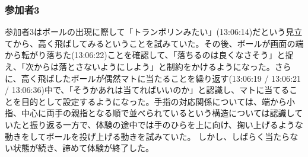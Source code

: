 \subsubsection*{参加者3}
参加者3はボールの出現に際して「トランポリンみたい」(13:06:14)だという見立てから、高く飛ばしてみるということを試みていた。その後、ボールが画面の端から転がり落ちた(13:06:22)ことを確認して、「落ちるのは良くなさそう」と捉え、「次からは落とさないようにしよう」と制約をかけるようになった。さらに、高く飛ばしたボールが偶然マトに当たることを繰り返す(13:06:19 / 13:06:21 / 13:06:36)中で、「そうかあれは当てればいいのか」と認識し、マトに当てることを目的として設定するようになった。手指の対応関係については、端から小指、中心に両手の親指となる順で並べられているという構造については認識していたと振り返る一方で、体験の途中では手のひらを上に向け、掬い上げるような動きをしてボールを投げ上げる動きを試みていた。
しかし、しばらく当たらない状態が続き、諦めて体験が終了した。

